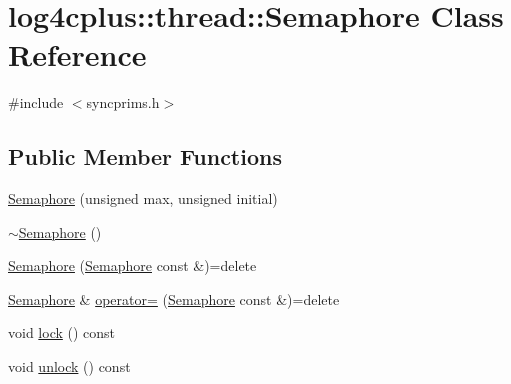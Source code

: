 \hypertarget{classlog4cplus_1_1thread_1_1Semaphore}{\section{log4cplus\-:\-:thread\-:\-:Semaphore Class Reference}
\label{classlog4cplus_1_1thread_1_1Semaphore}
}


{\ttfamily \#include $<$syncprims.\-h$>$}

\subsection*{Public Member Functions}
\begin{DoxyCompactItemize}
\item 
\hyperlink{classlog4cplus_1_1thread_1_1Semaphore_a6f3fd9117085e1c5a0659f730000ba3e}{Semaphore} (unsigned max, unsigned initial)
\item 
\hyperlink{classlog4cplus_1_1thread_1_1Semaphore_a6a1838cd263b11e2b5b718aa76f8d48d}{$\sim$\-Semaphore} ()
\item 
\hyperlink{classlog4cplus_1_1thread_1_1Semaphore_a7ee350cfbafafffcd588e4544e00264b}{Semaphore} (\hyperlink{classlog4cplus_1_1thread_1_1Semaphore}{Semaphore} const \&)=delete
\item 
\hyperlink{classlog4cplus_1_1thread_1_1Semaphore}{Semaphore} \& \hyperlink{classlog4cplus_1_1thread_1_1Semaphore_ac36ed260382124b4f45d68ed75a3e663}{operator=} (\hyperlink{classlog4cplus_1_1thread_1_1Semaphore}{Semaphore} const \&)=delete
\item 
void \hyperlink{classlog4cplus_1_1thread_1_1Semaphore_a4f402cce8ece00a937a3d4f6f096545a}{lock} () const 
\item 
void \hyperlink{classlog4cplus_1_1thread_1_1Semaphore_aaa124a2f8b8b89e96bbdf60781de2e2d}{unlock} () const 
\end{DoxyCompactItemize}


